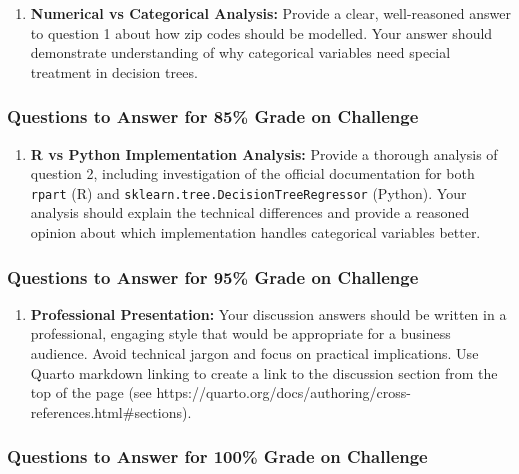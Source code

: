 \documentclass[
  letterpaper,
  DIV=11,
  numbers=noendperiod]{scrartcl}
\providecommand{\tightlist}{%
  \setlength{\itemsep}{0pt}\setlength{\parskip}{0pt}}
\begin{document}
\begin{enumerate}
\def\labelenumi{\arabic{enumi}.}
\tightlist
\item
  \textbf{Numerical vs Categorical Analysis:} Provide a clear,
  well-reasoned answer to question 1 about how zip codes should be
  modelled. Your answer should demonstrate understanding of why
  categorical variables need special treatment in decision trees.
\end{enumerate}

\subsubsection{Questions to Answer for 85\% Grade on
Challenge}\label{questions-to-answer-for-85-grade-on-challenge}

\begin{enumerate}
\def\labelenumi{\arabic{enumi}.}
\setcounter{enumi}{1}
\tightlist
\item
  \textbf{R vs Python Implementation Analysis:} Provide a thorough
  analysis of question 2, including investigation of the official
  documentation for both \texttt{rpart} (R) and
  \texttt{sklearn.tree.DecisionTreeRegressor} (Python). Your analysis
  should explain the technical differences and provide a reasoned
  opinion about which implementation handles categorical variables
  better.
\end{enumerate}

\subsubsection{Questions to Answer for 95\% Grade on
Challenge}\label{questions-to-answer-for-95-grade-on-challenge}

\begin{enumerate}
\def\labelenumi{\arabic{enumi}.}
\setcounter{enumi}{2}
\tightlist
\item
  \textbf{Professional Presentation:} Your discussion answers should be
  written in a professional, engaging style that would be appropriate
  for a business audience. Avoid technical jargon and focus on practical
  implications. Use Quarto markdown linking to create a link to the
  discussion section from the top of the page (see
  https://quarto.org/docs/authoring/cross-references.html\#sections).
\end{enumerate}

\subsubsection{Questions to Answer for 100\% Grade on
Challenge}\label{questions-to-answer-for-100-grade-on-challenge}
\end{document}

